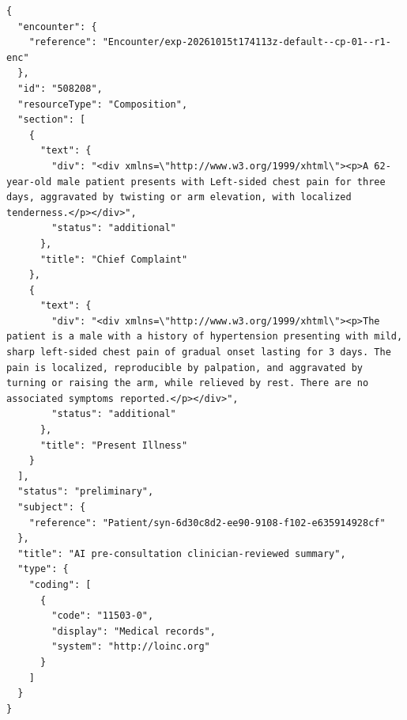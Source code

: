 \begin{Verbatim}[breaklines=true,breakanywhere=true,fontsize=\scriptsize]
{
  "encounter": {
    "reference": "Encounter/exp-20261015t174113z-default--cp-01--r1-enc"
  },
  "id": "508208",
  "resourceType": "Composition",
  "section": [
    {
      "text": {
        "div": "<div xmlns=\"http://www.w3.org/1999/xhtml\"><p>A 62-year-old male patient presents with Left-sided chest pain for three days, aggravated by twisting or arm elevation, with localized tenderness.</p></div>",
        "status": "additional"
      },
      "title": "Chief Complaint"
    },
    {
      "text": {
        "div": "<div xmlns=\"http://www.w3.org/1999/xhtml\"><p>The patient is a male with a history of hypertension presenting with mild, sharp left-sided chest pain of gradual onset lasting for 3 days. The pain is localized, reproducible by palpation, and aggravated by turning or raising the arm, while relieved by rest. There are no associated symptoms reported.</p></div>",
        "status": "additional"
      },
      "title": "Present Illness"
    }
  ],
  "status": "preliminary",
  "subject": {
    "reference": "Patient/syn-6d30c8d2-ee90-9108-f102-e635914928cf"
  },
  "title": "AI pre-consultation clinician-reviewed summary",
  "type": {
    "coding": [
      {
        "code": "11503-0",
        "display": "Medical records",
        "system": "http://loinc.org"
      }
    ]
  }
}
\end{Verbatim}
